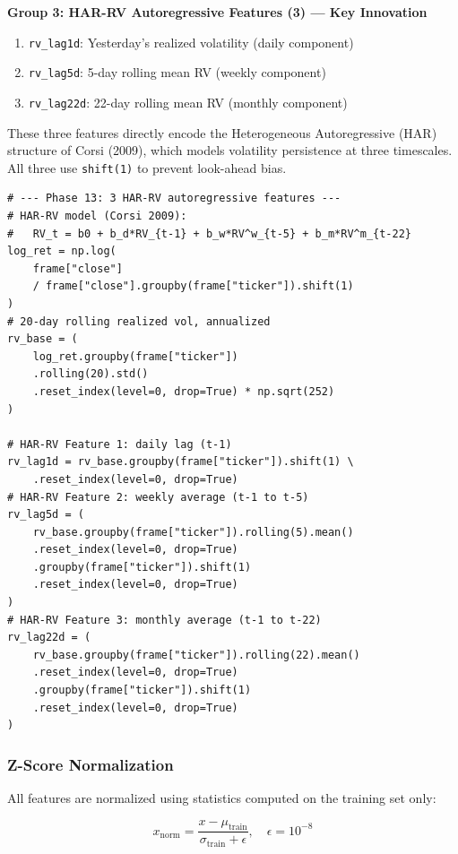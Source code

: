 \documentclass[12pt,a4paper]{article}
\begin{document}
\textbf{Group 3: HAR-RV Autoregressive Features (3) --- Key Innovation}
\begin{enumerate}
    \item \texttt{rv\_lag1d}: Yesterday's realized volatility (daily component)
    \item \texttt{rv\_lag5d}: 5-day rolling mean RV (weekly component)
    \item \texttt{rv\_lag22d}: 22-day rolling mean RV (monthly component)
\end{enumerate}

These three features directly encode the Heterogeneous Autoregressive (HAR) structure of Corsi (2009), which models volatility persistence at three timescales. All three use \texttt{shift(1)} to prevent look-ahead bias.

\begin{lstlisting}[caption={Price feature engineering --- HAR-RV features (src/features/price\_features.py)}]
# --- Phase 13: 3 HAR-RV autoregressive features ---
# HAR-RV model (Corsi 2009):
#   RV_t = b0 + b_d*RV_{t-1} + b_w*RV^w_{t-5} + b_m*RV^m_{t-22}
log_ret = np.log(
    frame["close"]
    / frame["close"].groupby(frame["ticker"]).shift(1)
)
# 20-day rolling realized vol, annualized
rv_base = (
    log_ret.groupby(frame["ticker"])
    .rolling(20).std()
    .reset_index(level=0, drop=True) * np.sqrt(252)
)

# HAR-RV Feature 1: daily lag (t-1)
rv_lag1d = rv_base.groupby(frame["ticker"]).shift(1) \
    .reset_index(level=0, drop=True)
# HAR-RV Feature 2: weekly average (t-1 to t-5)
rv_lag5d = (
    rv_base.groupby(frame["ticker"]).rolling(5).mean()
    .reset_index(level=0, drop=True)
    .groupby(frame["ticker"]).shift(1)
    .reset_index(level=0, drop=True)
)
# HAR-RV Feature 3: monthly average (t-1 to t-22)
rv_lag22d = (
    rv_base.groupby(frame["ticker"]).rolling(22).mean()
    .reset_index(level=0, drop=True)
    .groupby(frame["ticker"]).shift(1)
    .reset_index(level=0, drop=True)
)
\end{lstlisting}

\subsubsection{Z-Score Normalization}

All features are normalized using statistics computed on the training set only:

\begin{equation}
    x_{\text{norm}} = \frac{x - \mu_{\text{train}}}{\sigma_{\text{train}} + \epsilon}, \quad \epsilon = 10^{-8}
\end{equation}
\end{document}

